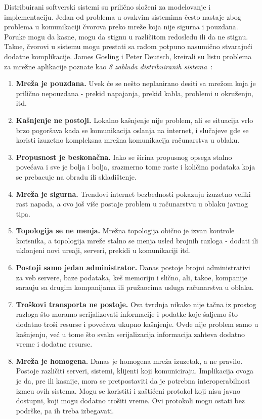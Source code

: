 Distribuirani softverski sistemi su prilično slo\v zeni za modelovanje i implementaciju. Jedan od problema u ovakvim sistemima \v cesto nastaje zbog problema u komunikaciji \v cvorova preko mre\v ze koja nije sigurna i pouzdana. Poruke mogu da kasne, mogu da stignu u razli\v citom redosledu ili da ne stignu. Tako\dj e, \v cvorovi u sistemu mogu prestati sa radom potpuno nasumi\v cno stvaraju\'ci dodatne komplikacije. James Gosling i Peter Deutsch, kreirali su listu problema za mre\v zne aplikacije poznate kao \textit{8 zabluda distribuiranih sistema}~\cite{articleRotem}:

\begin{enumerate}[start=1,label={(\bfseries \arabic*)}]
	\item \textbf{Mre\v za je pouzdana.} Uvek \'ce se ne\v sto neplanirano desiti sa mre\v zom koja je prili\v cno nepouzdana - prekid napajanja, prekid kabla, problemi u okru\v zenju, itd.
	\item \textbf{Ka\v snjenje ne postoji.} Lokalno ka\v snjenje nije problem, ali se situacija vrlo brzo pogor\v sava kada se komunikacija oslanja na internet, i slu\v cajeve gde se koristi izuzetno kompleksna mre\v zna komunikacija ra\v cunarstva u oblaku.
	\item \textbf{Propusnost je beskona\v cna.} Iako se \v sirina propusnog opsega stalno pove\'cava i sve je bolja i bolja, srazmerno tome raste i koli\v cina podataka koja se prebacuje na obradu ili skladi\v stenje.
	\item \textbf{Mre\v za je sigurna.} Trendovi internet bezbednosti pokazuju izuzetno veliki rast napada, a ovo jo\v s vi\v se postaje problem u ra\v cunarstvu u oblaku javnog tipa.
	\item \textbf{Topologija se ne menja.} Mre\v zna topologija obi\v cno je izvan kontrole korisnika, a topologija mre\v ze stalno se menja usled brojnih razloga - dodati ili uklonjeni novi ure\dj aji, serveri, prekidi u komunikaciji itd.
	\item \textbf{Postoji samo jedan administrator.} Danas postoje brojni administrativi za veb servere, baze podataka, ke\v s memoriju i sli\v cno, ali, tako\dj e, kompanije sara\dj uju sa drugim kompanijama ili pru\v zaocima usluga ra\v cunarstva u oblaku.
	\item \textbf{Tro\v skovi transporta ne postoje.} Ova tvrdnja nikako nije ta\v cna iz prostog razloga \v sto moramo serijalizovati informacije i podatke koje \v saljemo \v sto dodatno tro\v si resurse i pove\'cava ukupno ka\v snjenje. Ovde nije problem samo u ka\v snjenju, ve\'c u tome \v sto svaka serijalizacija informacija zahteva dodatno vreme i dodatne resurse.
	\item \textbf{Mre\v za je homogena.} Danas je homogena mre\v za izuzetak, a ne pravilo. Postoje razli\v citi serveri, sistemi, klijenti koji komuniciraju. Implikacija ovoga je da, pre ili kasnije, mora se pretpostaviti da je potrebna interoperabilnost izme\dj u ovih sistema. Mogu se koristiti i za\v sti\'ceni protokol koji nisu javno dostupni, koji mogu dodatno tro\v siti vreme. Ovi protokoli mogu ostati bez podr\v ske, pa ih treba izbegavati.
\end{enumerate}

